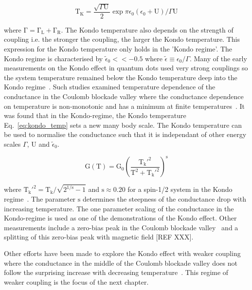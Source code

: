 \begin{equation}\label{eq:kondo_temp}
  \mathrm{T_K} = 
  \frac{\sqrt{\Gamma \mathrm{U}}}{2}
  \exp{\pi \epsilon_0 (\epsilon_0 + \mathrm{U})/\Gamma\mathrm{U}}
\end{equation}

where $\mathrm{\Gamma = \Gamma_L + \Gamma_R}$. The Kondo temperature also depends on the strength of coupling i.e. the stronger the coupling, the larger the Kondo temperature. This expression for the Kondo temperature only holds in the 'Kondo regime'. The Kondo regime is characterised by $\tilde{\epsilon}_0<<-0.5$ where $\tilde{\epsilon}\equiv \epsilon_0/\Gamma$. Many of the early measurements on the Kondo effect in quantum dots used very strong couplings so the system temperature remained below the Kondo temperature deep into the Kondo regime~\cite{kondo_unitary}. Such studies examined temperature dependence of the conductance in the Coulomb blockade valley where the conductance dependence on temperature is non-monotonic and has a minimum at finite temperatures~\cite{Pustilnik2004}.  It was found that in the Kondo-regime, the Kondo temperature Eq.~\ref{eq:kondo_temp} sets a new many body scale. The Kondo temperature can be used to normalise the conductance such that it is independant of other energy scales $\Gamma$, $\mathrm{U}$ and $\tilde{\epsilon}_0$.

\begin{equation}\label{eq:kondo_conductance}
  \mathrm{G(T)} =
  \mathrm{G_0}
  \left(
  \frac{\mathrm{T_k'^{2}}}{\mathrm{T^2} + \mathrm{T_k'^{2}}}
  \right)^\mathrm{s}
\end{equation}

where $\mathrm{T_k'^{2}} = \mathrm{T_k}/\sqrt{2^{\mathrm{1/s}}-1}$ and $\mathrm{s} \approx 0.20$ for a spin-1/2 system in the Kondo regime~\cite{goldhaber_mv}. The parameter $\mathrm{s}$ determines the steepness of the conductance drop with increasing temperature. The one parameter scaling of the conductance in the Kondo-regime is used as one of the demonstrations of the Kondo effect. Other measurements include a zero-bias peak in the Coulomb blockade valley~\cite{kondo_unitary} and a splitting of this zero-bias peak with magnetic field [REF XXX].  

Other efforts have been made to explore the Kondo effect with weaker coupling where the conductance in the middle of the Coulomb blockade valley does not follow the surprising increase with decreasing temperature~\cite{goldhaber_mv}. This regime of weaker coupling is the focus of the next chapter. 




